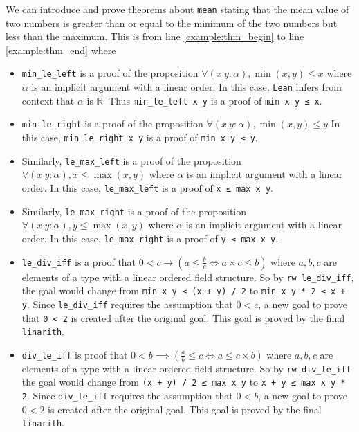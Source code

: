 \documentclass{report}
\theoremstyle{definition}
\begin{document}
We can introduce and prove theorems about {\tt \small mean} stating that the mean value of two numbers is greater than or equal to the minimum of the two numbers but less than the maximum. This is from line \ref{example:thm_begin} to line \ref{example:thm_end} where
\begin{itemize}
  \item {\tt \small min\_le\_left} is a proof of the proposition $\forall (x\ y : \alpha), \min(x, y) \le x$ where $\alpha$ is an implicit argument with a linear order. In this case, {\tt \small Lean} infers from context that $\alpha$ is $\mathbb R$. Thus {\tt \small min\_le\_left x y} is a proof of {\tt \small min x y ≤ x}.
  \item {\tt \small min\_le\_right} is a proof of the proposition $\forall (x\ y : \alpha), \min(x, y) \le y$ In this case, {\tt \small min\_le\_right x y} is a proof of {\tt \small min x y ≤ y}.
  \item Similarly, {\tt \small le\_max\_left} is a proof of the proposition $\forall (x\ y : \alpha), x \le \max(x, y)$ where $\alpha$ is an implicit argument with a linear order. In this case, {\tt \small le\_max\_left} is a proof of {\tt \small x ≤ max x y}.
  \item Similarly, {\tt \small le\_max\_right} is a proof of the proposition $\forall (x\ y : \alpha), y \le \max(x, y)$ where $\alpha$ is an implicit argument with a linear order. In this case, {\tt \small le\_max\_right} is a proof of {\tt \small y ≤ max x y}.
  \item {\tt \small le\_div\_iff} is a proof that $0 < c \to (a \le \frac{b}{c} \iff a\times c \le b)$ where $a,b,c$ are elements of a type with a linear ordered field structure. So by {\tt \small rw le\_div\_iff}, the goal would change from {\tt \small min x y ≤ (x + y) / 2} to {\tt \small min x y * 2 ≤ x + y}. Since {\tt \small le\_div\_iff} requires the assumption that $0<c$, a new goal to prove that {\tt \small 0 < 2} is created after the original goal. This goal is proved by the final {\tt \small linarith}.
  \item {\tt \small div\_le\_iff} is proof that $0 < b \implies (\frac a b \le c \iff a \le c \times b)$ where $a,b,c$ are elements of a type with a linear ordered field structure. So by {\tt \small rw div\_le\_iff} the goal would change from {\tt \small (x + y) / 2 ≤ max x y} to {\tt \small x + y ≤ max x y * 2}. Since {\tt \small div\_le\_iff} requires the assumption that $0 < b$, a new goal to prove $0 < 2$ is created after the original goal. This goal is proved by the final {\tt \small linarith}.

\end{itemize}
\end{document}
